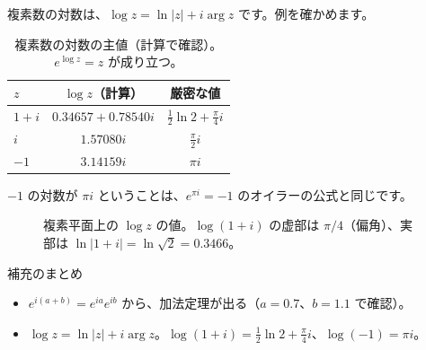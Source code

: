 \documentclass[a4paper,11pt,openany]{ltjsbook}
\begin{document}
複素数の対数は、$\log z=\ln|z|+i\arg z$ です。例を確かめます。

\begin{table}[htbp]
\centering
\begin{tabular}{lcc}
\toprule
$z$ & $\log z$（計算） & 厳密な値\\
\midrule
$1+i$ & $0.34657+0.78540i$ & $\tfrac12\ln2+\tfrac\pi4i$\\
$i$ & $1.57080i$ & $\tfrac\pi2i$\\
$-1$ & $3.14159i$ & $\pi i$\\
\bottomrule
\end{tabular}
\caption{複素数の対数の主値（計算で確認）。$e^{\log z}=z$ が成り立つ。}
\end{table}

$-1$ の対数が $\pi i$ ということは、$e^{\pi i}=-1$ のオイラーの公式と同じです。

\begin{figure}[htbp]
\centering
{}
\caption{複素平面上の $\log z$ の値。$\log(1+i)$ の虚部は $\pi/4$（偏角）、実部は $\ln|1+i|=\ln\sqrt2=0.3466$。}
\end{figure}

\begin{pointbox}{補充のまとめ}
\begin{itemize}[leftmargin=*]
\item $e^{i(a+b)}=e^{ia}e^{ib}$ から、加法定理が出る（$a=0.7$、$b=1.1$ で確認）。
\item $\log z=\ln|z|+i\arg z$。$\log(1+i)=\tfrac12\ln2+\tfrac\pi4i$、$\log(-1)=\pi i$。
\end{itemize}
\end{pointbox}
\end{document}
